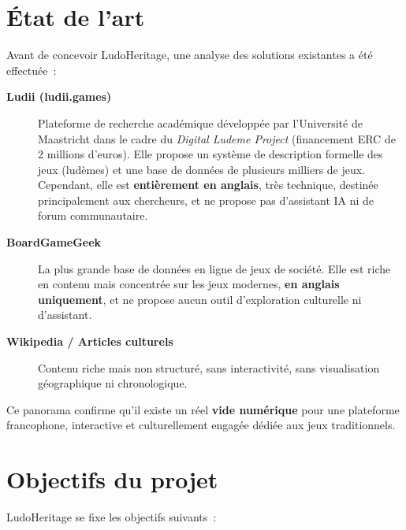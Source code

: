 \section{État de l'art}

Avant de concevoir LudoHeritage, une analyse des solutions existantes a été effectuée~:

\begin{description}
    \item[\textbf{Ludii (ludii.games)}] Plateforme de recherche académique développée par
    l'Université de Maastricht dans le cadre du \textit{Digital Ludeme Project} (financement ERC
    de 2 millions d'euros). Elle propose un système de description formelle des jeux (ludèmes) et
    une base de données de plusieurs milliers de jeux. Cependant, elle est \textbf{entièrement en
    anglais}, très technique, destinée principalement aux chercheurs, et ne propose pas d'assistant
    IA ni de forum communautaire.

    \item[\textbf{BoardGameGeek}] La plus grande base de données en ligne de jeux de société.
    Elle est riche en contenu mais concentrée sur les jeux modernes, \textbf{en anglais uniquement},
    et ne propose aucun outil d'exploration culturelle ni d'assistant.

    \item[\textbf{Wikipedia / Articles culturels}] Contenu riche mais non structuré, sans
    interactivité, sans visualisation géographique ni chronologique.
\end{description}

Ce panorama confirme qu'il existe un réel \textbf{vide numérique} pour une plateforme francophone,
interactive et culturellement engagée dédiée aux jeux traditionnels.

\section{Objectifs du projet}

LudoHeritage se fixe les objectifs suivants~:

